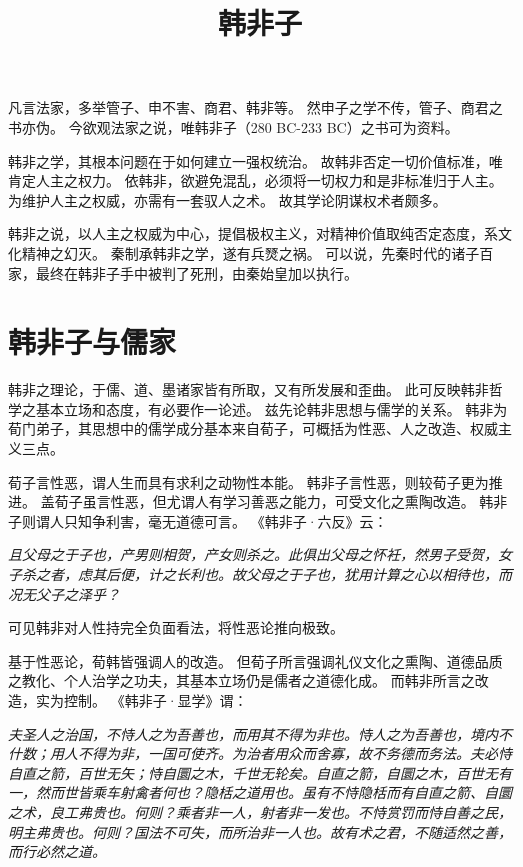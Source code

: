 \documentclass[11pt]{article}
\title{韩非子}
\date{}
\begin{document}
  \maketitle
  
  \linenumbers

凡言法家，多举管子、申不害、商君、韩非等。
然申子之学不传，管子、商君之书亦伪。
今欲观法家之说，唯韩非子（280 BC-233 BC）之书可为资料。

\newline

韩非之学，其根本问题在于如何建立一强权统治。
故韩非否定一切价值标准，唯肯定人主之权力。
依韩非，欲避免混乱，必须将一切权力和是非标准归于人主。
为维护人主之权威，亦需有一套驭人之术。
故其学论阴谋权术者颇多。

\newline

韩非之说，以人主之权威为中心，提倡极权主义，对精神价值取纯否定态度，系文化精神之幻灭。
秦制承韩非之学，遂有兵燹之祸。
可以说，先秦时代的诸子百家，最终在韩非子手中被判了死刑，由秦始皇加以执行。
  
\section{韩非子与儒家}
韩非之理论，于儒、道、墨诸家皆有所取，又有所发展和歪曲。
此可反映韩非哲学之基本立场和态度，有必要作一论述。
兹先论韩非思想与儒学的关系。
韩非为荀门弟子，其思想中的儒学成分基本来自荀子，可概括为性恶、人之改造、权威主义三点。

\newline

荀子言性恶，谓人生而具有求利之动物性本能。
韩非子言性恶，则较荀子更为推进。
盖荀子虽言性恶，但尤谓人有学习善恶之能力，可受文化之熏陶改造。
韩非子则谓人只知争利害，毫无道德可言。
《韩非子·六反》云：

\textit{且父母之于子也，产男则相贺，产女则杀之。此俱出父母之怀衽，然男子受贺，女子杀之者，虑其后便，计之长利也。故父母之于子也，犹用计算之心以相待也，而况无父子之泽乎？}
  
可见韩非对人性持完全负面看法，将性恶论推向极致。

\newline

基于性恶论，荀韩皆强调人的改造。
但荀子所言强调礼仪文化之熏陶、道德品质之教化、个人治学之功夫，其基本立场仍是儒者之道德化成。
而韩非所言之改造，实为控制。
《韩非子·显学》谓：

\textit{夫圣人之治国，不恃人之为吾善也，而用其不得为非也。恃人之为吾善也，境内不什数；用人不得为非，一国可使齐。为治者用众而舍寡，故不务德而务法。夫必恃自直之箭，百世无矢；恃自圜之木，千世无轮矣。自直之箭，自圜之木，百世无有一，然而世皆乘车射禽者何也？隐栝之道用也。虽有不恃隐栝而有自直之箭、自圜之术，良工弗贵也。何则？乘者非一人，射者非一发也。不恃赏罚而恃自善之民，明主弗贵也。何则？国法不可失，而所治非一人也。故有术之君，不随适然之善，而行必然之道。}
\end{document}
